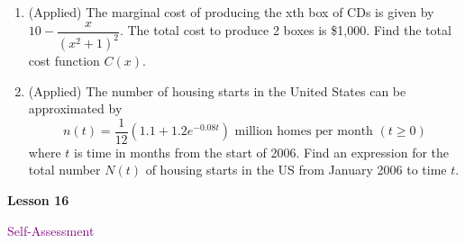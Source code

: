 \documentclass[10pt]{book}
\theoremstyle{definition}
\theoremstyle{remark}
\begin{document}
\begin{large}
\begin{enumerate}
\item (Applied) The marginal cost of producing the xth box of CDs is given by $10 - \dfrac{x}{(x^2 + 1)^2}$. The total cost to produce 2 boxes is \$1,000. Find the total cost function $C(x)$.
\vfil\vfil

\item (Applied) The number of housing starts in the United States can be approximated by \[n(t) = \dfrac{1}{12} \left(1.1 + 1.2e^{-0.08t} \right) \text{ million homes per month }(t \geq 0)\] where $t$ is time in months from the start of 2006. Find an expression for the total number $N(t)$ of housing starts in the US from January 2006 to time $t$.\vfil
\end{enumerate}
\end{large}
\newpage


\begin{tcolorbox}[
  width=\textwidth,
  colback=gray!10, %
  colframe=white, %
  boxrule=0pt,    %
  left=1cm,       %
  right=1cm,      %
  sharp corners  %
]

\begin{minipage}[t]{0.5\textwidth}
  \Huge \textbf{Lesson 16}
\end{minipage}%
\hfill
\begin{minipage}[t]{0.5\textwidth}
  \Huge\textcolor{purple}{Self-Assessment}
\end{minipage}
\end{tcolorbox}
\end{document}
